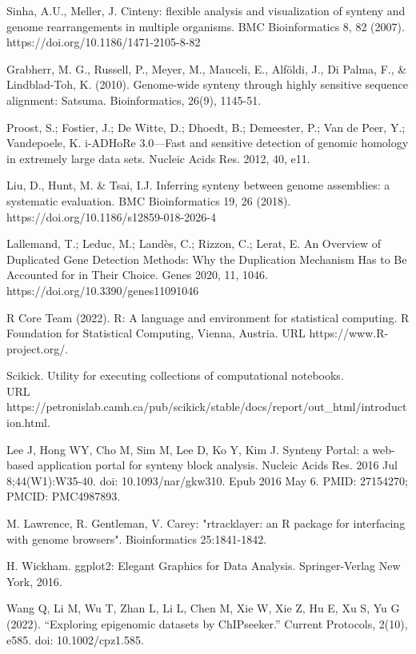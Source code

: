 \documentclass[12pt]{article}
\begin{document}
\begin{thebibliography}{99}
 Sinha, A.U., Meller, J. Cinteny: flexible analysis and
visualization of synteny and genome rearrangements in multiple organisms.
BMC Bioinformatics 8, 82 (2007). https://doi.org/10.1186/1471-2105-8-82

 Grabherr, M. G., Russell, P., Meyer, M., Mauceli,
E., Alföldi, J., Di Palma, F., \& Lindblad-Toh, K. (2010). Genome-wide
synteny through highly sensitive sequence alignment: Satsuma.
Bioinformatics, 26(9), 1145-51.


 Proost, S.; Fostier, J.; De Witte, D.; Dhoedt, B.;
Demeester, P.; Van de Peer, Y.; Vandepoele, K. i-ADHoRe 3.0—Fast and sensitive
detection of genomic homology in extremely large data sets. Nucleic Acids Res.
2012, 40, e11.

 Liu, D., Hunt, M. \& Tsai, I.J. Inferring synteny between
genome assemblies: a systematic evaluation. BMC Bioinformatics 19, 26 (2018).
https://doi.org/10.1186/s12859-018-2026-4

 Lallemand, T.; Leduc, M.; Landès, C.; Rizzon, C.; Lerat, E.
An Overview of Duplicated Gene Detection Methods: Why the Duplication Mechanism
Has to Be Accounted for in Their Choice. Genes 2020, 11, 1046.
https://doi.org/10.3390/genes11091046

 R Core Team (2022).
R: A language and environment for statistical computing. R Foundation
for Statistical Computing, Vienna, Austria. URL https://www.R-project.org/.

 Scikick. Utility for executing collections of computational
notebooks.\\
URL https://petronislab.camh.ca/pub/scikick/stable/docs/report/out\_html/introduction.html.

 Lee J, Hong WY, Cho M, Sim M, Lee D, Ko Y, Kim J. Synteny
Portal: a web-based application portal for synteny block analysis. Nucleic
Acids Res. 2016 Jul 8;44(W1):W35-40. doi: 10.1093/nar/gkw310. Epub 2016 May 6.
PMID: 27154270; PMCID: PMC4987893.

 M. Lawrence, R. Gentleman, V. Carey: "rtracklayer: an {R}
package for interfacing with genome browsers". Bioinformatics 25:1841-1842.

 H. Wickham. ggplot2: Elegant Graphics for Data Analysis.
Springer-Verlag New York, 2016.

 Wang Q, Li M, Wu T, Zhan L, Li L, Chen M, Xie W, Xie Z, Hu E,
Xu S, Yu G (2022). “Exploring epigenomic datasets by ChIPseeker.” Current
Protocols, 2(10), e585. doi: 10.1002/cpz1.585.


\end{thebibliography}
\end{document}
